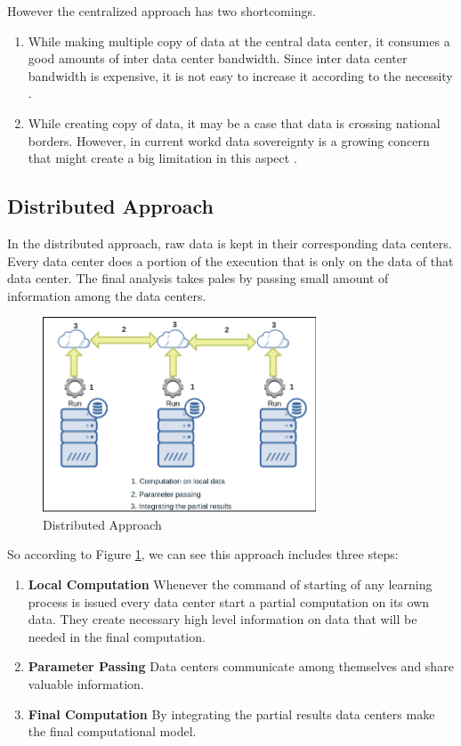 However the centralized approach has two shortcomings.
\begin{enumerate}
\item While making multiple copy of data at the central data center, it consumes a good amounts of inter data center bandwidth. Since inter data center bandwidth is expensive, it is not easy to increase it according to the necessity \cite{7,8,9,10}.
\item While creating copy of data, it may be a case that data is crossing national borders. However, in current workd data sovereignty is a growing concern that might create a big limitation in this aspect \cite{11,12}.

\end{enumerate}

\subsection{Distributed Approach}
In the distributed approach, raw data is kept in their corresponding data centers. Every data center does a portion of the execution that is only on the data of that data center. The final analysis takes pales by passing small amount of information among the data centers. 

\begin{figure}[!htbp]
  \centering
	\includegraphics[width=3.2in]{figures/2.png}
	\caption{Distributed Approach}
\label{distributed}
\end{figure}

So according to Figure \ref{distributed}, we can see this approach includes three steps:

\begin{enumerate}
\item \textbf{Local Computation} Whenever the command of starting of any learning process is issued every data center start a partial computation on its own data. They create necessary high level information on data that will be needed in the final computation.

\item \textbf{Parameter Passing} Data centers communicate among themselves and share valuable information.

\item \textbf{Final Computation} By integrating the partial results data centers make the final computational model.
\end{enumerate}

